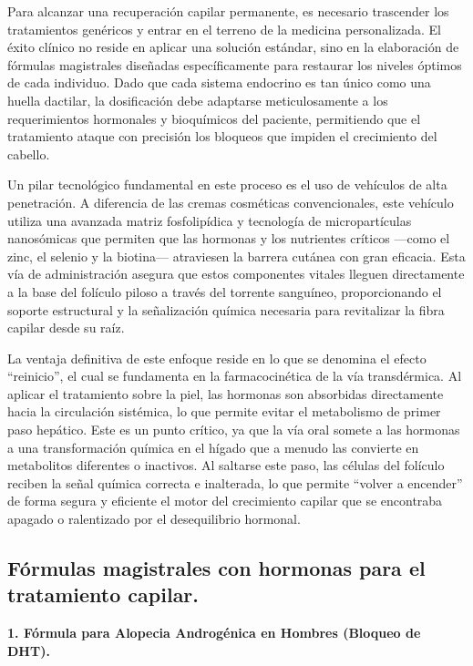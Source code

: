 \documentclass[
  spanish,
]{article}
\begin{document}
Para alcanzar una recuperación capilar permanente, es necesario trascender los tratamientos genéricos y entrar en el terreno de la medicina personalizada. El éxito clínico no reside en aplicar una solución estándar, sino en la elaboración de fórmulas magistrales diseñadas específicamente para restaurar los niveles óptimos de cada individuo. Dado que cada sistema endocrino es tan único como una huella dactilar, la dosificación debe adaptarse meticulosamente a los requerimientos hormonales y bioquímicos del paciente, permitiendo que el tratamiento ataque con precisión los bloqueos que impiden el crecimiento del cabello.

Un pilar tecnológico fundamental en este proceso es el uso de vehículos de alta penetración. A diferencia de las cremas cosméticas convencionales, este vehículo utiliza una avanzada matriz fosfolipídica y tecnología de micropartículas nanosómicas que permiten que las hormonas y los nutrientes críticos ---como el zinc, el selenio y la biotina--- atraviesen la barrera cutánea con gran eficacia. Esta vía de administración asegura que estos componentes vitales lleguen directamente a la base del folículo piloso a través del torrente sanguíneo, proporcionando el soporte estructural y la señalización química necesaria para revitalizar la fibra capilar desde su raíz.

La ventaja definitiva de este enfoque reside en lo que se denomina el efecto ``reinicio'', el cual se fundamenta en la farmacocinética de la vía transdérmica. Al aplicar el tratamiento sobre la piel, las hormonas son absorbidas directamente hacia la circulación sistémica, lo que permite evitar el metabolismo de primer paso hepático. Este es un punto crítico, ya que la vía oral somete a las hormonas a una transformación química en el hígado que a menudo las convierte en metabolitos diferentes o inactivos. Al saltarse este paso, las células del folículo reciben la señal química correcta e inalterada, lo que permite ``volver a encender'' de forma segura y eficiente el motor del crecimiento capilar que se encontraba apagado o ralentizado por el desequilibrio hormonal.

\subsection{Fórmulas magistrales con hormonas para el tratamiento capilar.}\label{fuxf3rmulas-magistrales-con-hormonas-para-el-tratamiento-capilar.}

\textbf{1. Fórmula para Alopecia Androgénica en Hombres (Bloqueo de DHT).}
\end{document}
